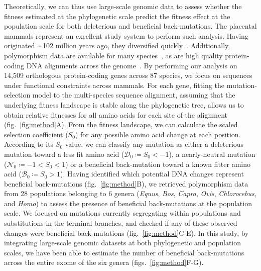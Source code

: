 \documentclass[12pt]{article}
\newcommand{\Sphy}{S_{0}}
\newcommand{\SphyDel}{\mathcal{D}_0}
\newcommand{\SphyNeu}{\mathcal{N}_0}
\newcommand{\SphyBen}{\mathcal{B}_0}
\begin{document}
Theoretically, we can thus use large-scale genomic data to assess whether the fitness estimated at the phylogenetic scale predict the fitness effect at the population scale for both deleterious and beneficial back-mutations.
The placental mammals represent an excellent study system to perform such analysis.
Having originated $\sim$102 million years ago, they diversified quickly~\cite{foley_genomic_2023}.
Additionally, polymorphism data are available for many species~\cite{howe_ensembl_2021}, as are high quality protein-coding DNA alignments across the genome~\cite{scornavacca_orthomam_2019}.
By performing our analysis on 14,509 orthologous protein-coding genes across 87 species, we focus on sequences under functional constraints across mammals.
For each gene, fitting the mutation-selection model to the multi-species sequence alignment, assuming that the underlying fitness landscape is stable along the phylogenetic tree, allows us to obtain relative fitnesses for all amino acids for each site of the alignment (fig.~\ref{fig:method}A).
From the fitness landscape, we can calculate the scaled selection coefficient ($\Sphy$) for any possible amino acid change at each position.
According to its $\Sphy$ value, we can classify any mutation as either a deleterious mutation toward a less fit amino acid ($\SphyDel \coloneqq \Sphy < -1$), a nearly-neutral mutation ($\SphyNeu \coloneqq -1 < \Sphy <1$) or a beneficial back-mutation toward a known fitter amino acid ($\SphyBen \coloneqq \Sphy > 1$).
Having identified which potential DNA changes represent beneficial back-mutations (fig.~\ref{fig:method}B), we retrieved polymorphism data from 28 populations belonging to 6 genera (\textit{Equus}, \textit{Bos}, \textit{Capra}, \textit{Ovis}, \textit{Chlorocebus}, and \textit{Homo}) to assess the presence of beneficial back-mutations at the population scale.
We focused on mutations currently segregating within populations and substitutions in the terminal branches, and checked if any of these observed changes were beneficial back-mutations (fig.~\ref{fig:method}C-E).
In this study, by integrating large-scale genomic datasets at both phylogenetic and population scales, we have been able to estimate the number of beneficial back-mutations across the entire exome of the six genera (figs.~\ref{fig:method}F-G).
\end{document}
